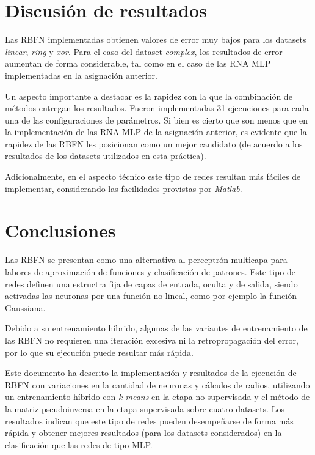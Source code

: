 \documentclass[journal]{IEEEtran}
\begin{document}


\section{Discusión de resultados}
\label{sec:discusion}
Las RBFN implementadas obtienen valores de error muy bajos para los datasets \emph{linear}, \emph{ring} y \emph{xor}.
Para el caso del dataset \emph{complex}, los resultados de error aumentan de forma considerable, tal como en el caso de las RNA MLP implementadas en la asignación anterior.

Un aspecto importante a destacar es la rapidez con la que la combinación de métodos entregan los resultados.
Fueron implementadas 31 ejecuciones para cada una de las configuraciones de parámetros.
Si bien es cierto que son menos que en la implementación de las RNA MLP de la asignación anterior, es evidente que la rapidez de las RBFN les posicionan como un mejor candidato (de acuerdo a los resultados de los datasets utilizados en esta práctica).

Adicionalmente, en el aspecto técnico este tipo de redes resultan más fáciles de implementar, considerando las facilidades provistas por \emph{Matlab}.



\section{Conclusiones}
\label{sec:conclusiones}
Las RBFN se presentan como una alternativa al perceptrón multicapa para labores de aproximación de funciones y clasificación de patrones.
Este tipo de redes definen una estructra fija de capas de entrada, oculta y de salida, siendo activadas las neuronas por una función no lineal, como por ejemplo la función Gaussiana.

Debido a su entrenamiento híbrido, algunas de las variantes de entrenamiento de las RBFN no requieren una iteración excesiva ni la retropropagación del error, por lo que su ejecución puede resultar más rápida.

Este documento ha descrito la implementación y resultados de la ejecución de RBFN con variaciones en la cantidad de neuronas y cálculos de radios, utilizando un entrenamiento híbrido con \emph{k-means} en la etapa no supervisada y el método de la matriz pseudoinversa en la etapa supervisada sobre cuatro datasets.
Los resultados indican que este tipo de redes pueden desempeñarse de forma más rápida y obtener mejores resultados (para los datasets considerados) en la clasificación que las redes de tipo MLP.

\nocite{*}


\end{document}
